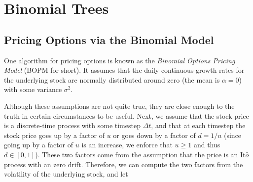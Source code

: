 \chapter{Binomial Trees}


\section{Pricing Options via the Binomial Model}

One algorithm for pricing options is known as the \emph{Binomial Options Pricing Model} (BOPM for
short). It assumes that the daily continuous growth rates for the underlying stock are normally distributed
around zero (the mean is $\alpha = 0$) with some variance $\sigma^2$. 

Although these assumptions are not quite true, they are close enough to the truth in certain circumstances to be useful. Next, we assume that the stock price is a discrete-time process with some timestep $\Delta t$, and that at
each timestep the stock price goes up by a factor of $u$ or goes down by a factor of $d = 1/u$ (since going up
by a factor of $u$ is an increase, we enforce that $u \geq 1$ and thus $d \in [0, 1]$). 
These two factors come from the assumption that the price is an It$\hat{o}$ process with an zero drift. Therefore, we can compute the two factors from the volatility of the underlying stock, and let

